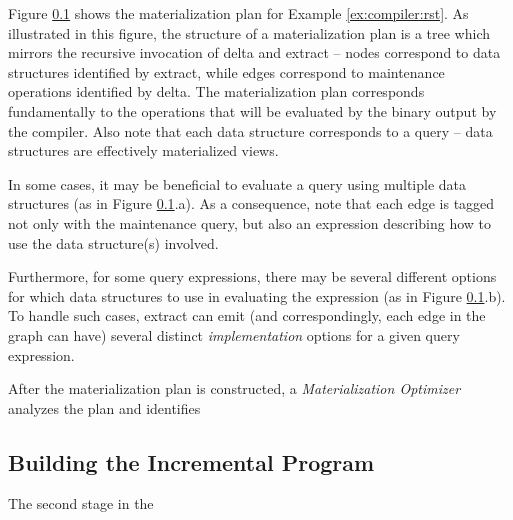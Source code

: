 Figure \ref{} shows the materialization plan for Example \ref{ex:compiler:rst}.  As illustrated in this figure, the structure of a materialization plan is a tree which mirrors the recursive invocation of delta and extract -- nodes correspond to data structures identified by extract, while edges correspond to maintenance operations identified by delta.  The materialization plan corresponds fundamentally to the operations that will be evaluated by the binary output by the compiler.  Also note that each data structure corresponds to a query -- data structures are effectively materialized views.  

In some cases, it may be beneficial to evaluate a query using multiple data structures (as in Figure \ref{}.a).  As a consequence, note that each edge is tagged not only with the maintenance query, but also an expression describing how to use the data structure(s) involved.

Furthermore, for some query expressions, there may be several different options for which data structures to use in evaluating the expression (as in Figure \ref{}.b).  To handle such cases, extract can emit (and correspondingly, each edge in the graph can have) several distinct {\em implementation} options for a given query expression.  

After the materialization plan is constructed, a {\em Materialization Optimizer} analyzes the plan and identifies 

\subsection{Building the Incremental Program}
The second stage in the 
